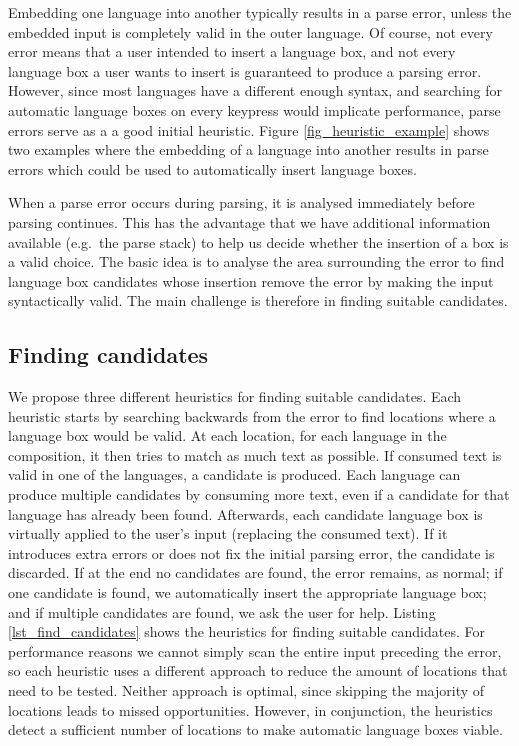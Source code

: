 \documentclass[sigplan,screen]{acmart}\settopmatter{printfolios=true,printccs=false,printacmref=false}
\begin{document}
Embedding one language into another typically results in a parse error, unless
the embedded input is completely valid in the outer language. Of course, not
every error means that a user intended to insert a language box, and not every
language box a user wants to insert is guaranteed to produce a parsing error.
However, since most languages have a different enough syntax, and searching for
automatic language boxes on every keypress would implicate performance, parse
errors serve as a a good initial heuristic. Figure \ref{fig_heuristic_example}
shows two examples where the embedding of a language into another results in
parse errors which could be used to automatically insert language boxes.

When a parse error occurs during parsing, it is analysed immediately before
parsing continues. This has
the advantage that we have additional information available (e.g.~the parse
stack) to help us decide whether the insertion of a box is a valid choice.
The basic idea is to analyse the area surrounding the error to find language
box candidates whose insertion remove the error by making the input
syntactically valid. The main challenge is therefore in finding suitable
candidates.

\subsection{Finding candidates}

We propose three different heuristics for finding suitable candidates. Each heuristic
starts by searching backwards from the error to find locations where a
language box would be valid. At each location, for each language in the composition,
it then tries to match as much text as possible. If consumed text is valid in one
of the languages, a candidate is produced. Each language can produce multiple
candidates by consuming more text, even if a candidate for that language has
already been found. Afterwards, each candidate language box is virtually
applied to the user's input (replacing the consumed text). If it introduces
extra errors or does not fix the initial parsing error, the candidate is
discarded. If at the end no candidates are found, the error
remains, as normal; if one candidate is found, we automatically insert the
appropriate language box; and if multiple candidates are found, we ask the user
for help.
Listing \ref{lst_find_candidates} shows the heuristics for finding suitable
candidates.
For performance reasons we cannot simply scan the entire input preceding the error,
so each heuristic uses a different approach to reduce the amount of locations that
need to be tested. Neither approach is optimal, since skipping the majority of locations
leads to missed opportunities. However, in conjunction, the heuristics detect a sufficient
number of locations to make automatic language boxes viable.
\end{document}
